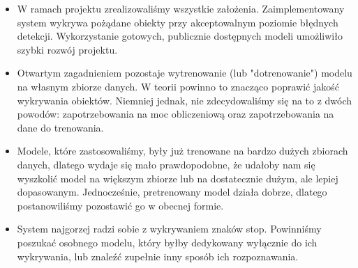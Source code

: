\begin{itemize}
	\item W ramach projektu zrealizowaliśmy wszystkie założenia. Zaimplementowany system wykrywa pożądane obiekty przy akceptowalnym poziomie błędnych detekcji. Wykorzystanie gotowych, publicznie dostępnych modeli umożliwiło szybki rozwój projektu.
	
	\item Otwartym zagadnieniem pozostaje wytrenowanie (lub "dotrenowanie") modelu na własnym zbiorze danych. W teorii powinno to znacząco poprawić jakość wykrywania obiektów. Niemniej jednak, nie zdecydowaliśmy się na to z dwóch powodów: zapotrzebowania na moc obliczeniową oraz zapotrzebowania na dane do trenowania.
	
	\item Modele, które zastosowaliśmy, były już trenowane na bardzo dużych zbiorach danych, dlatego wydaje się mało prawdopodobne, że udałoby nam się wyszkolić model na większym zbiorze lub na dostatecznie dużym, ale lepiej dopasowanym. Jednocześnie, pretrenowany model działa dobrze, dlatego postanowiliśmy pozostawić go w obecnej formie.
	
	\item System najgorzej radzi sobie z wykrywaniem znaków stop. Powinniśmy poszukać osobnego modelu, który byłby dedykowany wyłącznie do ich wykrywania, lub znaleźć zupełnie inny sposób ich rozpoznawania.
	
	
\end{itemize}